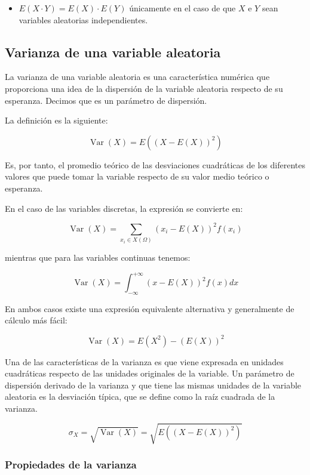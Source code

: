 \documentclass[
]{article}
\providecommand{\tightlist}{%
  \setlength{\itemsep}{0pt}\setlength{\parskip}{0pt}}
\begin{document}
\begin{itemize}
\tightlist
\item
  \(E(X \cdot Y)=E(X) \cdot E(Y)\) únicamente en el caso de que \(X\) e
  \(Y\) sean variables aleatorias independientes.
\end{itemize}

\subsection{Varianza de una variable aleatoria}\label{varianza-de-una-variable-aleatoria}

La varianza de una variable aleatoria es una característica numérica que
proporciona una idea de la dispersión de la variable aleatoria respecto
de su esperanza. Decimos que es un parámetro de dispersión.

La definición es la siguiente:

\[
\operatorname{Var}(X)=E\left((X-E(X))^{2}\right)
\]

Es, por tanto, el promedio teórico de las desviaciones cuadráticas de
los diferentes valores que puede tomar la variable respecto de su valor
medio teórico o esperanza.

En el caso de las variables discretas, la expresión se convierte en:

\[
\operatorname{Var}(X)=\sum_{x_{i} \in X(\Omega)}\left(x_{i}-E(X)\right)^{2} f\left(x_{i}\right)
\]

mientras que para las variables continuas tenemos:

\[
\operatorname{Var}(X)=\int_{-\infty}^{+\infty}(x-E(X))^{2} f(x) d x
\]

En ambos casos existe una expresión equivalente alternativa y
generalmente de cálculo más fácil:

\[
\operatorname{Var}(X)=E\left(X^{2}\right)-(E(X))^{2}
\]

Una de las características de la varianza es que viene expresada en
unidades cuadráticas respecto de las unidades originales de la variable.
Un parámetro de dispersión derivado de la varianza y que tiene las
mismas unidades de la variable aleatoria es la desviación típica, que se
define como la raíz cuadrada de la varianza.

\[
\sigma_{X}=\sqrt{\operatorname{Var}(X)}=\sqrt{E\left((X-E(X))^{2}\right)}
\]

\subsubsection{Propiedades de la varianza}\label{propiedades-de-la-varianza}
\end{document}

